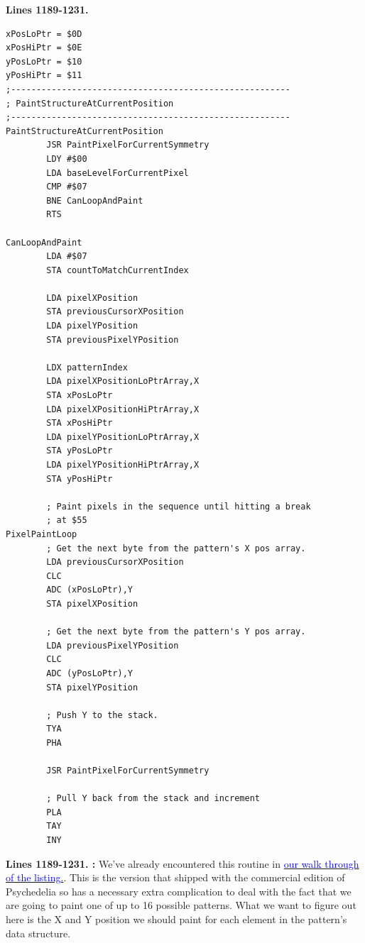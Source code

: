 \clearpage
\textbf{Lines 1189-1231. } 
\begin{lstlisting}[basicstyle=\ttfamily\scriptsize, caption=The routine responsible for painting patterns.]
xPosLoPtr = $0D
xPosHiPtr = $0E
yPosLoPtr = $10
yPosHiPtr = $11
;-------------------------------------------------------
; PaintStructureAtCurrentPosition
;-------------------------------------------------------
PaintStructureAtCurrentPosition   
        JSR PaintPixelForCurrentSymmetry
        LDY #$00
        LDA baseLevelForCurrentPixel
        CMP #$07
        BNE CanLoopAndPaint
        RTS 

CanLoopAndPaint   
        LDA #$07
        STA countToMatchCurrentIndex

        LDA pixelXPosition
        STA previousCursorXPosition
        LDA pixelYPosition
        STA previousPixelYPosition

        LDX patternIndex
        LDA pixelXPositionLoPtrArray,X
        STA xPosLoPtr
        LDA pixelXPositionHiPtrArray,X
        STA xPosHiPtr
        LDA pixelYPositionLoPtrArray,X
        STA yPosLoPtr
        LDA pixelYPositionHiPtrArray,X
        STA yPosHiPtr

        ; Paint pixels in the sequence until hitting a break
        ; at $55
PixelPaintLoop   
        ; Get the next byte from the pattern's X pos array.
        LDA previousCursorXPosition
        CLC 
        ADC (xPosLoPtr),Y
        STA pixelXPosition

        ; Get the next byte from the pattern's Y pos array.
        LDA previousPixelYPosition
        CLC 
        ADC (yPosLoPtr),Y
        STA pixelYPosition

        ; Push Y to the stack.
        TYA 
        PHA 

        JSR PaintPixelForCurrentSymmetry

        ; Pull Y back from the stack and increment
        PLA 
        TAY 
        INY 
\end{lstlisting}
\clearpage

\textbf{Lines 1189-1231. :} We've already encountered this routine
in \hyperref[sec:listing_commentary]{\textcolor{blue}{ our walk through of the listing.}}. This is the version that shipped 
with the commercial edition of Psychedelia so has a necessary extra complication to deal with the fact that we 
are going to paint one of up to 16 possible patterns. What we want to figure out here is the X and Y position we should
paint for each element in the pattern's data structure.

